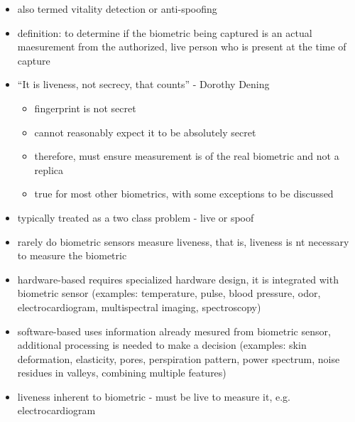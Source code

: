 \documentclass[paper=a4, fontsize=11pt]{scrartcl} %
\numberwithin{equation}{section} %
\numberwithin{figure}{section} %
\numberwithin{table}{section} %
\begin{document}
\begin{itemize}
\item also termed vitality detection or anti-spoofing
\item definition: to determine if the biometric being captured is an actual maesurement from the authorized, live person who is present at the time of capture
\item ``It is liveness, not secrecy, that counts'' - Dorothy Dening
\begin{itemize}
\item fingerprint is not secret
\item cannot reasonably expect it to be absolutely secret
\item therefore, must ensure measurement is of the real biometric and not a replica
\item true for most other biometrics, with some exceptions to be discussed
\end{itemize}
\item typically treated as a two class problem - live or spoof
\item rarely do biometric sensors measure liveness, that is, liveness is nt necessary to measure the biometric
\item hardware-based requires specialized hardware design, it is integrated with biometric sensor (examples: temperature, pulse, blood pressure, odor, electrocardiogram, multispectral imaging, spectroscopy)
\item software-based uses information already mesured from biometric sensor, additional processing is needed to make a decision (examples: skin deformation, elasticity, pores, perspiration pattern, power spectrum, noise residues in valleys, combining multiple features)
\item liveness inherent to biometric - must be live to measure it, e.g. electrocardiogram
\end{itemize}
\end{document}
